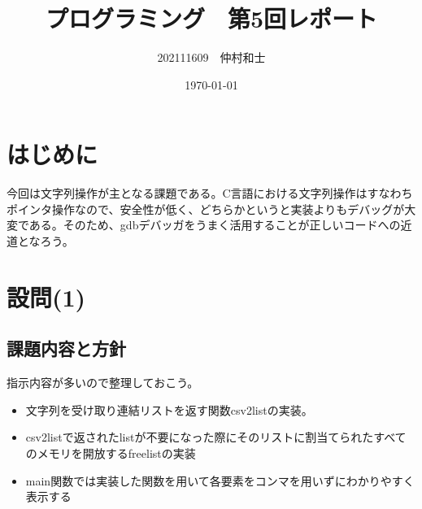 \documentclass[dvipdfmx,12pt,a4j]{jarticle}
\title{プログラミング　第5回レポート}
\author{202111609　仲村和士}
\date{\today}
\begin{document}
\maketitle

\section{はじめに}
今回は文字列操作が主となる課題である。C言語における文字列操作はすなわちポインタ操作なので、安全性が低く、どちらかというと実装よりもデバッグが大変である。そのため、gdbデバッガをうまく活用することが正しいコードへの近道となろう。

\section{設問(1)}
\subsection{課題内容と方針}\label{sec:q1}
指示内容が多いので整理しておこう。
\begin{itemize}
  \item 文字列を受け取り連結リストを返す関数csv2listの実装。
  \item csv2listで返されたlistが不要になった際にそのリストに割当てられたすべてのメモリを開放するfreelistの実装
  \item main関数では実装した関数を用いて各要素をコンマを用いずにわかりやすく表示する
\end{itemize}
\end{document}
